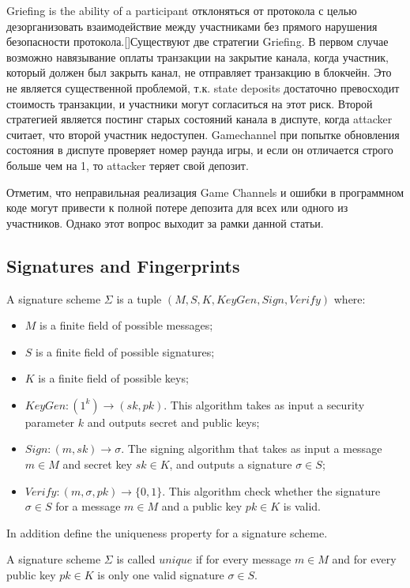 Griefing is the ability of a participant отклоняться от протокола с целью дезорганизовать взаимодействие между участниками без прямого нарушения безопасности протокола.[]Существуют две стратегии Griefing.  В первом случае возможно навязывание оплаты транзакции на закрытие канала, когда участник, который должен был закрыть канал, не отправляет транзакцию в блокчейн. Это не является существенной проблемой, т.к. state deposits достаточно превосходит стоимость транзакции, и участники могут согласиться на этот риск. Второй стратегией является постинг старых состояний канала в диспуте, когда attacker считает, что второй участник недоступен. Gamechannel при попытке обновления состояния в диспуте проверяет номер раунда игры, и если он отличается строго больше чем на 1, то attacker теряет свой депозит.


Отметим, что неправильная реализация Game Channels и ошибки в программном коде могут привести к полной потере депозита для всех или одного из участников. Однако этот вопрос выходит за рамки данной статьи.
	\subsection{Signatures and Fingerprints}
\begin{defn}
A signature scheme $ \Sigma $ is a tuple $(M, S, K, KeyGen, Sign, Verify)$ where:
	\begin{itemize}
		\item $ M $ is a finite field of possible messages;
		\item $ S $ is a finite field of possible signatures;
		\item $ K $ is a finite field of possible keys;
		\item $ KeyGen: (1^k) \rightarrow (sk, pk) $. This algorithm takes as input a security parameter $k$ and outputs secret and public keys;
		\item $Sign: (m, sk) \rightarrow \sigma $. The signing algorithm that takes as input a message $m \in M$ and secret key $sk \in K$, and outputs a signature $\sigma \in S$;
	\item $Verify: (m, \sigma, pk) \rightarrow \{0, 1\} $. This algorithm check whether the signature $\sigma \in S$ for a message $m \in M$ and a public key $pk \in K$ is valid.
	\end{itemize}
\end{defn}
In addition define the uniqueness property for a signature scheme. 
\begin{defn}
A signature scheme $ \Sigma $ is called $unique$ if for every message $m \in M$ and for every public key $pk \in K$ is only one valid signature $\sigma \in S$.
\end{defn}


